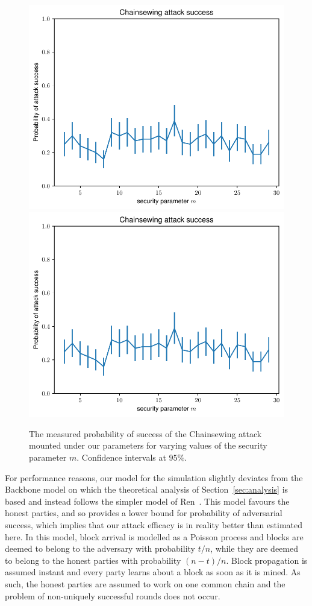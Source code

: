 \begin{figure}
	\begin{center}
		\iftwocolumn
			\includegraphics[width=0.9\columnwidth]{figures/attack-confidence.pdf}
		\else
			\includegraphics[width=0.7 \columnwidth]{figures/attack-confidence.pdf}
		\fi
	\end{center}
	\caption{The measured probability of success of the Chainsewing attack mounted under our parameters for varying values of the security parameter $m$. Confidence intervals at $95\%$.}
	\label{fig:confidence}
\end{figure}

For performance reasons, our model for the simulation slightly deviates from the Backbone model on which the theoretical analysis of Section~\ref{sec:analysis} is based and instead follows the simpler model of Ren~\cite{nakamoto-simple}. This model favours the honest parties, and so provides a lower bound for probability of adversarial success, which implies that our attack efficacy is in reality better than estimated here. In this model, block arrival is modelled as a Poisson process and blocks are deemed to belong to the adversary with probability $t / n$, while they are deemed to belong to the honest parties with probability $(n - t) / n$. Block propagation is assumed instant and every party learns about a block as soon as it is mined. As such, the honest parties are assumed to work on one common chain and the problem of non-uniquely successful rounds does not occur.

